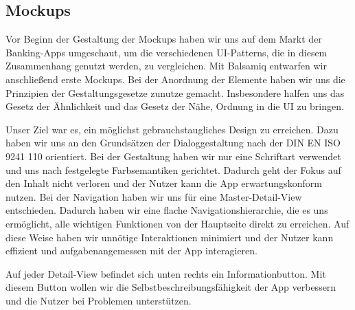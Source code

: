 
\subsection{Mockups}
	Vor Beginn der Gestaltung der Mockups haben wir uns auf dem Markt der Banking-Apps umgeschaut, um die verschiedenen UI-Patterns, die in diesem Zusammenhang genutzt werden, zu vergleichen. Mit Balsamiq entwarfen wir anschließend erste Mockups. Bei der Anordnung der Elemente haben wir uns die Prinzipien der Gestaltungsgesetze zunutze gemacht. Insbesondere halfen uns das Gesetz der Ähnlichkeit und das Gesetz der Nähe, Ordnung in die UI zu bringen. 

	Unser Ziel war es, ein möglichst gebrauchstaugliches Design zu erreichen. Dazu haben wir uns an den Grundsätzen der Dialoggestaltung nach der DIN EN ISO 9241 110 orientiert. Bei der Gestaltung haben wir nur eine Schriftart verwendet und uns nach festgelegte Farbsemantiken gerichtet. Dadurch geht der Fokus auf den Inhalt nicht verloren und der Nutzer kann die App erwartungskonform nutzen. Bei der Navigation haben wir uns für eine Master-Detail-View entschieden. Dadurch haben wir eine flache Navigationshierarchie, die es uns ermöglicht, alle wichtigen Funktionen von der Hauptseite direkt zu erreichen. Auf diese Weise haben wir unnötige Interaktionen minimiert und der Nutzer kann effizient und aufgabenangemessen mit der App interagieren.  

	Auf jeder Detail-View befindet sich unten rechts ein Informationbutton. Mit diesem Button wollen wir die Selbstbeschreibungsfähigkeit der App verbessern und die Nutzer bei Problemen unterstützen.
	
